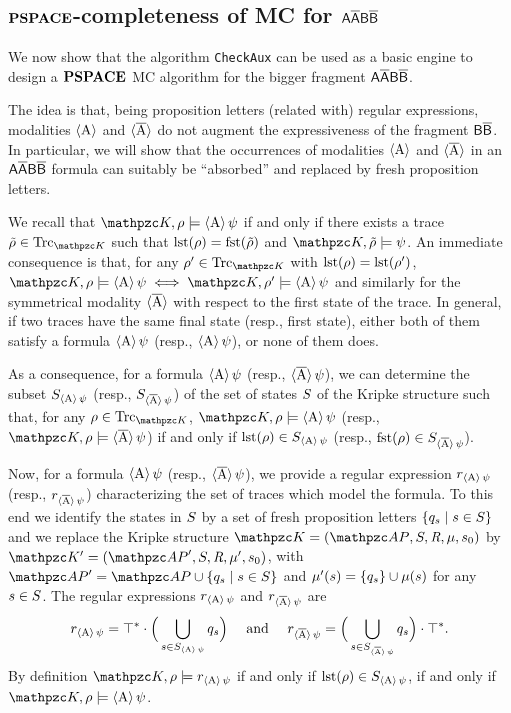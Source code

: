 \subsection{$\textbf{PSPACE}$-completeness of MC for $\mathsf{A\overline{A}B\overline{B}}$} \label{sect:genResult}

We now show that the algorithm \texttt{CheckAux} can be used as a basic engine to design a $\textbf{PSPACE}$ MC algorithm for the bigger fragment $\mathsf{A\overline{A}B\overline{B}}$. 

The idea is that, being proposition letters (related with) regular expressions, modalities $\operatorname{\langle A\rangle}$ and $\operatorname{\langle \overline{A}\rangle}$ do not augment the expressiveness of the fragment $\mathsf{B}\mathsf{\overline{B}}$. In particular,
we will show that the occurrences of modalities  $\operatorname{\langle A\rangle}$ and $\operatorname{\langle \overline{A}\rangle}$ in an $\mathsf{A\overline{A}B\overline{B}}$ formula can suitably be ``absorbed'' and replaced by fresh proposition letters.
%


We recall that
$\Ku,\rho\models \hsA \psi$ if and only if there exists a trace $\tilde{\rho}\in\Trk_{\Ku}$ such that $\operatorname{lst}(\rho)=\operatorname{fst}(\tilde{\rho})$ and $\Ku,\tilde{\rho}\models \psi$. An immediate consequence is that, for any $\rho'\in\Trk_{\Ku}$ with $\operatorname{lst}(\rho)=\operatorname{lst}(\rho')$, $\Ku,\rho\models \hsA \psi\iff \Ku,\rho'\models \hsA \psi$ and similarly for the symmetrical modality $\operatorname{\langle \overline{A}\rangle}$ with respect to the first state of the trace. In general, if two traces have the same final state (resp., first state), either both of them satisfy a formula $\operatorname{\langle A\rangle} \psi$ (resp., $\operatorname{\langle A\rangle} \psi$), or none of them does.

As a consequence, for a formula $\operatorname{\langle A\rangle}\psi$ (resp., $\operatorname{\langle \overline{A}\rangle}\psi$), we can determine the subset $S_{\operatorname{\langle A\rangle}\psi}$ (resp., $S_{\operatorname{\langle \overline{A}\rangle}\psi}$) of the set of states $S$ of the Kripke structure
such that, for any $\rho\in\Trk_{\Ku}$, $\Ku,\rho\models\hsA\psi$ (resp., 
$\Ku,\rho\models\hsAt\psi$) if and only if $\operatorname{lst}(\rho)\in S_{\operatorname{\langle A\rangle}\psi}$
(resp., $\operatorname{fst}(\rho)\in S_{\operatorname{\langle \overline{A}\rangle}\psi}$).

Now, for a formula $\operatorname{\langle A\rangle}\psi$ (resp., $\operatorname{\langle \overline{A}\rangle}\psi$), we provide a regular expression $r_{\operatorname{\langle A\rangle}\psi}$ (resp., $r_{\operatorname{\langle \overline{A}\rangle}\psi}$) characterizing the set of traces which model the formula.
To this end we identify the states in $S$ by a set of  fresh proposition letters $\{q_s\mid s\in S\}$ and we 
replace the Kripke structure  $\Ku=\KuDef$ by
$\Ku'=\tpl{\Prop',\States,\Edges,\Lab',\sinit}$, with $\Prop'=\Prop\cup \{q_s\mid s\in \States\}$ and $\mu'(s) = \{q_s\}\cup \mu(s)$ for any $s \in S$.
The regular expressions $r_{\operatorname{\langle A\rangle}\psi}$ and $r_{\operatorname{\langle \overline{A}\rangle}\psi}$ are  
\[r_{\operatorname{\langle A\rangle}\psi}=\top^*\cdot\Big( \bigcup_{s\in S_{\operatorname{\langle A\rangle}\psi}} q_s\Big)  \quad \text{ and } \quad r_{\operatorname{\langle \overline{A}\rangle}\psi}=\Big( \bigcup_{s\in S_{\operatorname{\langle \overline{A}\rangle}\psi}}q_s \Big)\cdot \top^*.\]
By definition $\Ku,\rho\models r_{\hsA \psi}$ if and only if $\operatorname{lst}(\rho)\in S_{\operatorname{\langle A\rangle}\psi}$, if and only if $\Ku,\rho\models \hsA \psi$.

